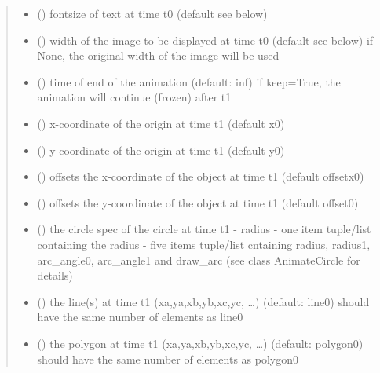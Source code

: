 \documentclass[letterpaper,10pt,english]{sphinxmanual}
\begin{document}
\begin{fulllineitems}
\begin{fulllineitems}
\begin{quote}
\begin{description}
\begin{itemize}
\item {} 
 () \textendash{} fontsize of text at time t0 (default see below)

\item {} 
 () \textendash{} width of the image to be displayed at time t0 (default see below) 
if None, the original width of the image will be used

\item {} 
 () \textendash{} time of end of the animation (default: inf) 
if keep=True, the animation will continue (frozen) after t1

\item {} 
 () \textendash{} x-coordinate of the origin at time t1 (default x0)

\item {} 
 () \textendash{} y-coordinate of the origin at time t1 (default y0)

\item {} 
 () \textendash{} offsets the x-coordinate of the object at time t1 (default offsetx0)

\item {} 
 () \textendash{} offsets the y-coordinate of the object at time t1 (default offset0)

\item {} 
 () \textendash{} the circle spec of the circle at time t1 
- radius 
- one item tuple/list containing the radius 
- five items tuple/list cntaining radius, radius1, arc\_angle0, arc\_angle1 and draw\_arc
(see class AnimateCircle for details)

\item {} 
 () \textendash{} the line(s) at time t1 (xa,ya,xb,yb,xc,yc, …) (default: line0) 
should have the same number of elements as line0

\item {} 
 () \textendash{} the polygon at time t1 (xa,ya,xb,yb,xc,yc, …) (default: polygon0) 
should have the same number of elements as polygon0


\end{itemize}
\end{description}
\end{quote}
\end{fulllineitems}
\end{fulllineitems}
\end{document}
